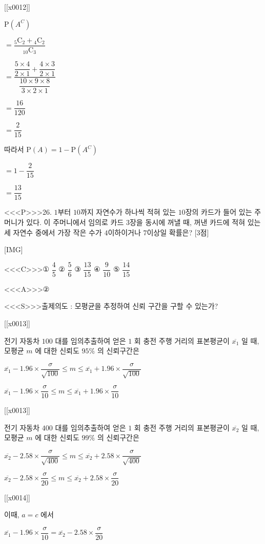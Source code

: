 \documentclass{oblivoir}
\begin{document}
[[x0012]]

$\mathrm{P}\left(A^{C}\right)$

$=\dfrac{{ }_{5} \mathrm{C}_{2}+{ }_{4} \mathrm{C}_{2}}{{ }_{10} \mathrm{C}_{3}}$

$=\dfrac{\dfrac{5 \times 4}{2 \times 1}+\dfrac{4 \times 3}{2 \times 1}}{\dfrac{10 \times 9 \times 8}{3 \times 2 \times 1}}$

$=\dfrac{16}{120}$

$=\dfrac{2}{15}$

따라서
$\mathrm{P}(A)=1-\mathrm{P}\left(A^{C}\right)$

$=1-\dfrac{2}{15}$

$=\dfrac{13}{15}$


<<<P>>>26. $1$부터 $10$까지 자연수가 하나씩 적혀 있는 $10$장의 카드가 들어 있는 주머니가 있다. 이 주머니에서 임의로 카드 $3$장을 동시에 꺼낼 때, 꺼낸 카드에 적혀 있는 세 자연수 중에서 가장 작은 수가 $4$이하이거나 $7$이상일 확률은? [3점]

[IMG]

<<<C>>>① $\dfrac{4}{5}$
② $\dfrac{5}{6}$
③ $\dfrac{13}{15}$
④ $\dfrac{9}{10}$
⑤ $\dfrac{14}{15}$


<<<A>>>②

<<<S>>>출제의도 : 모평균을 추정하여 신뢰 구간을 구할 수 있는가?

[[x0013]]

전기 자동차 $100$ 대를 임의추출하여 얻은 $1$ 회 충전 주행 거리의 표본평균이 $\overline{x_{1}}$ 일 때, 모평균 $m$ 에 대한 신뢰도 $95 \%$ 의 신뢰구간은

$\overline{x_{1}}-1.96 \times \dfrac{\sigma}{\sqrt{100}} \leq m \leq \overline{x_{1}}+1.96 \times \dfrac{\sigma}{\sqrt{100}}$

$\overline{x_{1}}-1.96 \times \dfrac{\sigma}{10} \leq m \leq \overline{x_{1}}+1.96 \times \dfrac{\sigma}{10}$

[[x0013]]

전기 자동차 $400$ 대를 임의추출하여 얻은 $1$ 회 충전 주행 거리의 표본평균이 $\overline{x_{2}}$ 일 때, 모평균 $m$ 에 대한 신뢰도 $99 \%$ 의 신뢰구간은

$\overline{x_{2}}-2.58 \times \dfrac{\sigma}{\sqrt{400}} \leq m \leq \overline{x_{2}}+2.58 \times \dfrac{\sigma}{\sqrt{400}}$

$\overline{x_{2}}-2.58 \times \dfrac{\sigma}{20} \leq m \leq \overline{x_{2}}+2.58 \times \dfrac{\sigma}{20}$

[[x0014]]

이때, $a=c$ 에서

$\overline{x_{1}}-1.96 \times \dfrac{\sigma}{10}=\overline{x_{2}}-2.58 \times \dfrac{\sigma}{20}$
\end{document}
